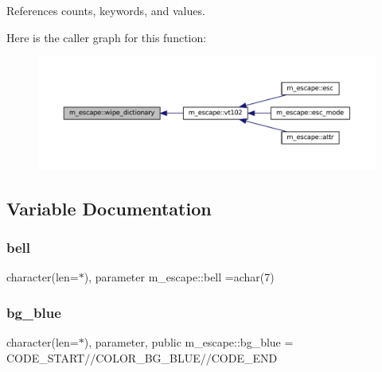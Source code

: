 References counts, keywords, and values.

Here is the caller graph for this function\+:\nopagebreak
\begin{figure}[H]
\begin{center}
\leavevmode
\includegraphics[width=350pt]{namespacem__escape_a1bc574bc97157fe67d868d2bd180c91e_icgraph}
\end{center}
\end{figure}


\subsection{Variable Documentation}
\mbox{\label{namespacem__escape_a2cd9c30d3783af9d1f74a50e7f1dbd7f}} 
\subsubsection{\texorpdfstring{bell}{bell}}
{\footnotesize\ttfamily character(len=$\ast$), parameter m\+\_\+escape\+::bell =achar(7)\hspace{0.3cm}{\ttfamily [private]}}

\mbox{\label{namespacem__escape_afab2229302287eaa0eb05add07bb6621}} 
\subsubsection{\texorpdfstring{bg\+\_\+blue}{bg\_blue}}
{\footnotesize\ttfamily character(len=$\ast$), parameter, public m\+\_\+escape\+::bg\+\_\+blue = C\+O\+D\+E\+\_\+\+S\+T\+A\+RT//C\+O\+L\+O\+R\+\_\+\+B\+G\+\_\+\+B\+L\+UE//C\+O\+D\+E\+\_\+\+E\+ND}

\mbox{\label{namespacem__escape_a7b7a979cd6dc44533f962d323c65a7b6}} 
